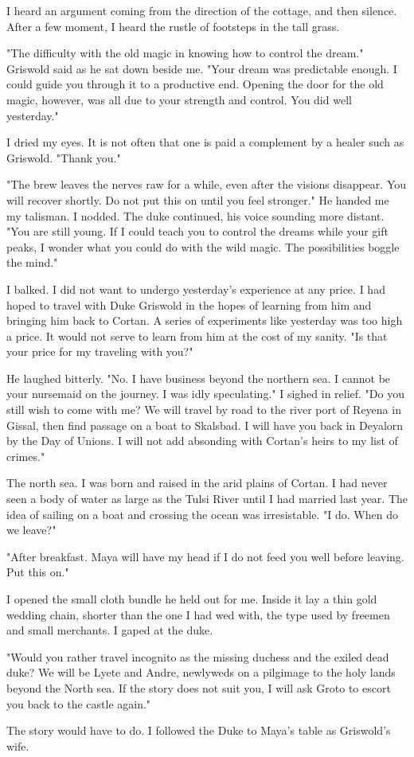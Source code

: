 \documentclass{article}
\begin{document}
I heard an argument coming from the direction of the cottage, and then silence. After a few moment, I heard the rustle of footsteps in the tall grass.

"The difficulty with the old magic in knowing how to control the dream." Griswold said as he sat down beside me. "Your dream was predictable enough. I could guide you through it to a productive end. Opening the door for the old magic, however, was all due to your strength and control. You did well yesterday."

I dried my eyes. It is not often that one is paid a complement by a healer such as Griswold. "Thank you."

"The brew leaves the nerves raw for a while, even after the visions disappear. You will recover shortly. Do not put this on until you feel stronger." He handed me my talisman. I nodded. The duke continued, his voice sounding more distant. "You are still young. If I could teach you to control the dreams while your gift peaks, I wonder what you could do with the wild magic. The possibilities boggle the mind."

I balked. I did not want to undergo yesterday's experience at any price. I had hoped to travel with Duke Griswold in the hopes of learning from him and bringing him back to Cortan. A series of experiments like yesterday was too high a price. It would not serve to learn from him at the cost of my sanity. "Is that your price for my traveling with you?"

He laughed bitterly. "No. I have business beyond the northern sea. I cannot be your nursemaid on the journey. I was idly speculating." I sighed in relief. "Do you still wish to come with me? We will travel by road to the river port of Reyena in Gissal, then find passage on a boat to Skalsbad. I will have you back in Deyalorn by the Day of Unions. I will not add absonding with Cortan's heirs to my list of crimes."

The north sea. I was born and raised in the arid plains of Cortan. I had never seen a body of water as large as the Tulsi River until I had married last year. The idea of sailing on a boat and crossing the ocean was irresistable. "I do. When do we leave?"

"After breakfast. Maya will have my head if I do not feed you well before leaving. Put this on."

I opened the small cloth bundle he held out for me. Inside it lay a thin gold wedding chain, shorter than the one I had wed with, the type used by freemen and small merchants. I gaped at the duke. 

"Would you rather travel incognito as the missing duchess and the exiled dead duke? We will be Lyete and Andre, newlyweds on a pilgimage to the holy lands beyond the North sea. If the story does not suit you, I will ask Groto to escort you back to the castle again."

The story would have to do. I followed the Duke to Maya's table as Griswold's wife.
\end{document}
